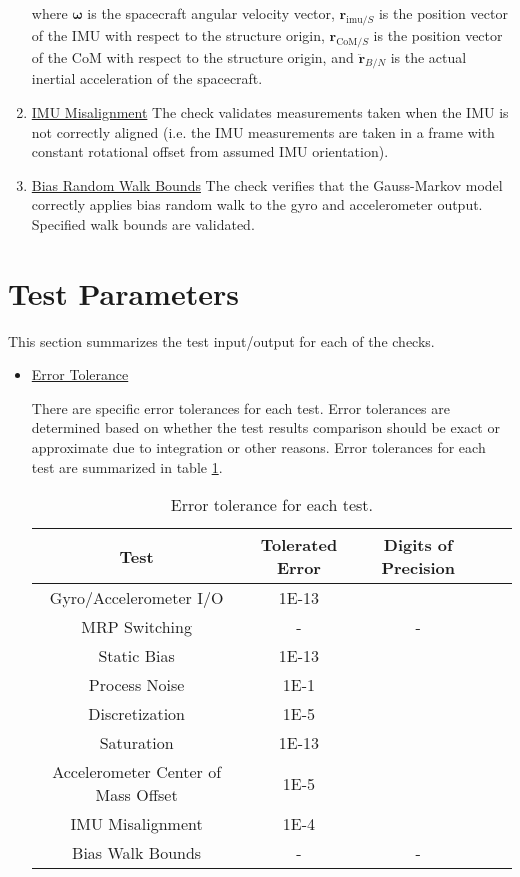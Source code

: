 \documentclass[]{BasiliskReportMemo}
\begin{document}
\begin{enumerate}
\begin{equation}
	\end{equation}
	where $\bm\omega$ is the spacecraft angular velocity vector, $\bm r_{\mathrm{imu}/S}$ is the position vector of the IMU with respect to the structure origin, $\bm r_{\mathrm{CoM}/S}$ is the position vector of the CoM with respect to the structure origin, and $ \ddot{\bm r}_{B/N}$ is the actual inertial acceleration of the spacecraft.
	\item \underline{IMU Misalignment} The check validates measurements taken when the IMU is not correctly aligned (i.e. the IMU measurements are taken in a frame with constant rotational offset from assumed IMU orientation).
	\item \underline{Bias Random Walk Bounds} The check verifies that the Gauss-Markov model correctly applies bias random walk to the gyro and accelerometer output. Specified walk bounds are validated.
\end{enumerate} 

\section{Test Parameters}

This section summarizes the test input/output for each of the checks. 
\begin{itemize}
\item \underline{Error Tolerance}

There are specific error tolerances for each test. Error tolerances are determined based on whether the test results comparison should be exact or approximate due to integration or other reasons. Error tolerances for each test are summarized in table \ref{tab:errortol}. 

\begin{table}[htbp]
	\caption{Error tolerance for each test.}
	\label{tab:errortol}
	\centering \fontsize{10}{10}\selectfont
	\begin{tabular}{| c | c | c | c | c |} %
		\hline
		\textbf{Test}   & \textbf{Tolerated Error} & \textbf{Digits of Precision} \\ \hline
		Gyro/Accelerometer I/O & 1E-13 & \\ \hline
		MRP Switching & - & - \\ \hline
		Static Bias & 1E-13 & \\ \hline
		Process Noise & 1E-1 & \\ \hline
		Discretization & 1E-5 & \\ \hline
		Saturation & 1E-13 & \\ \hline
		Accelerometer Center of Mass Offset & 1E-5 & \\ \hline
		IMU Misalignment & 1E-4 & \\ \hline
		Bias Walk Bounds & - & - \\ \hline
	\end{tabular}
\end{table}
\end{itemize}
\end{document}
